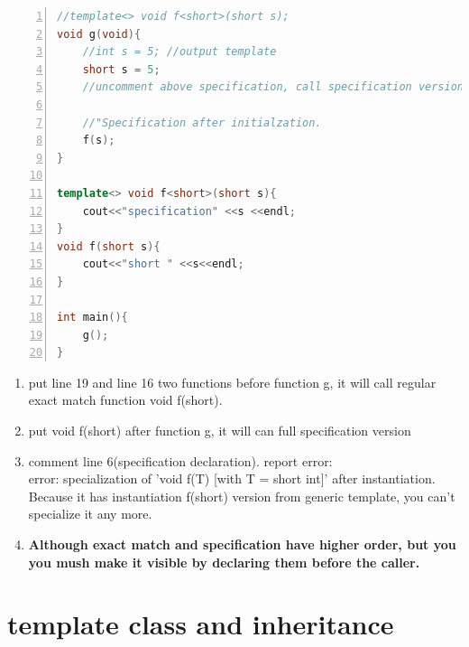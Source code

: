 \documentclass[a4paper,11pt,twoside]{book}
\begin{document}
\begin{itemize}
\begin{enumerate}
\begin{lstlisting}[frame=single, language=c++, numbers=left,
stepnumber=1,]
//template<> void f<short>(short s);
void g(void){
	//int s = 5; //output template
	short s = 5; 
	//uncomment above specification, call specification version.

	//"Specification after initialzation.
	f(s);
}

template<> void f<short>(short s){
	cout<<"specification" <<s <<endl;
}
void f(short s){
	cout<<"short " <<s<<endl;
}

int main(){
	g();
}
\end{lstlisting}

\begin{enumerate}
	\item put line 19 and line 16 two functions before function g, it will call regular exact match function void f(short). 
	
	\item put void f(short) after function g, it will can full specification version
	
	\item comment line 6(specification declaration). report error:\\
	error: specialization of 'void f(T) [with T = short int]' after instantiation.
	Because it has instantiation f(short) version from generic template, you can't specialize it any more.
	 
	\item \textbf{Although exact match and specification have higher order, but you you mush make it visible by declaring them before the caller.}
\end{enumerate}

\end{enumerate}

\end{itemize}


\section{template class and inheritance}
\end{document}

